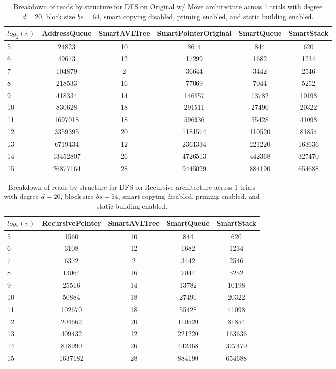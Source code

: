 \begin{table}[]
\centering
\begin{tabular}{|l|c|c|c|c|c|}
$log_2(n)$ & AddressQueue & SmartAVLTree & SmartPointerOriginal & SmartQueue & SmartStack \\ \hline
5 & 24823 & 10 & 8614 & 844 & 620 \\ \hline
6 & 49673 & 12 & 17299 & 1682 & 1234 \\ \hline
7 & 104879 & 2 & 36644 & 3442 & 2546 \\ \hline
8 & 218533 & 16 & 77069 & 7044 & 5252 \\ \hline
9 & 418334 & 14 & 146857 & 13782 & 10198 \\ \hline
10 & 830628 & 18 & 291511 & 27490 & 20322 \\ \hline
11 & 1697018 & 18 & 596936 & 55428 & 41098 \\ \hline
12 & 3359395 & 20 & 1181574 & 110520 & 81854 \\ \hline
13 & 6719434 & 12 & 2361334 & 221220 & 163636 \\ \hline
14 & 13452807 & 26 & 4726513 & 442368 & 327470 \\ \hline
15 & 26877164 & 28 & 9445029 & 884190 & 654688 \\ \hline
\end{tabular}
\caption{Breakdown of reads by structure for DFS on Original w/ Move architecture across 1 trials with degree $d=20$, block size $bs=64$, smart copying disabled, priming enabled, and static building enabled.}
    \label{tab:reads_by_structure_dfs_d20_bs64_trials1_copiesfalse_primetrue_staticinsertiontrue_ptoriginal_movetrue}
\end{table}

\begin{table}[]
\centering
\begin{tabular}{|l|c|c|c|c|}
$log_2(n)$ & RecursivePointer & SmartAVLTree & SmartQueue & SmartStack \\ \hline
5 & 1560 & 10 & 844 & 620 \\ \hline
6 & 3108 & 12 & 1682 & 1234 \\ \hline
7 & 6372 & 2 & 3442 & 2546 \\ \hline
8 & 13064 & 16 & 7044 & 5252 \\ \hline
9 & 25516 & 14 & 13782 & 10198 \\ \hline
10 & 50884 & 18 & 27490 & 20322 \\ \hline
11 & 102670 & 18 & 55428 & 41098 \\ \hline
12 & 204662 & 20 & 110520 & 81854 \\ \hline
13 & 409432 & 12 & 221220 & 163636 \\ \hline
14 & 818990 & 26 & 442368 & 327470 \\ \hline
15 & 1637182 & 28 & 884190 & 654688 \\ \hline
\end{tabular}
\caption{Breakdown of reads by structure for DFS on Recursive architecture across 1 trials with degree $d=20$, block size $bs=64$, smart copying disabled, priming enabled, and static building enabled.}
    \label{tab:reads_by_structure_dfs_d20_bs64_trials1_copiesfalse_primetrue_staticinsertiontrue_ptrecursive_movetrue}
\end{table}


